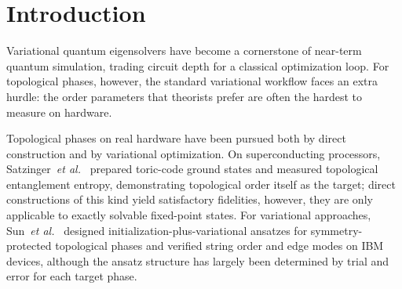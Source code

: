 \section{Introduction}
\label{sec:intro}

Variational quantum eigensolvers have become a cornerstone of
near-term quantum simulation, trading circuit depth for a classical
optimization loop. For topological phases, however, the standard
variational workflow faces an extra hurdle: the order parameters that
theorists prefer are often the hardest to measure on hardware.

Topological phases on real hardware have been pursued both by direct
construction and by variational optimization. On superconducting
processors, Satzinger~\textit{et al.}~\cite{satzinger2021realizing}
prepared toric-code ground states and measured topological entanglement
entropy, demonstrating topological order itself as the target; direct
constructions of this kind yield satisfactory fidelities, however, they
are only applicable to exactly solvable fixed-point states.
For variational approaches, Sun~\textit{et al.}~\cite{sun2023efficient}
designed initialization-plus-variational ansatzes for symmetry-protected
topological phases and verified string order and edge modes on IBM
devices, although the ansatz structure has largely been determined by
trial and error for each target phase.

